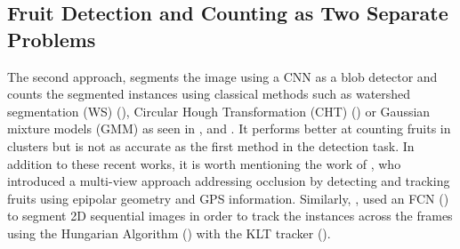 \subsection{Fruit Detection and Counting as Two Separate Problems}
The second approach, segments the image using a CNN as a blob detector and counts the segmented instances using classical methods such as watershed segmentation (WS) (\cite{beucher1992watershed}), Circular Hough Transformation (CHT) (\cite{atherton1999size}) or Gaussian mixture models (GMM) as seen in \cite{hani2018comparative}, \cite{bargoti2017image} and  \cite{chen2017counting}. It performs better at counting fruits in clusters but is not as accurate as the first method in the detection task. In addition to these recent works, it is worth mentioning the work of \cite{stein2016image}, who introduced a multi-view approach addressing occlusion by detecting and tracking fruits using epipolar geometry and GPS information. Similarly, \cite{liu2018robust}, used an FCN (\cite{long2015fully}) to segment 2D sequential images in order to track the instances across the frames using the Hungarian Algorithm (\cite{kuhn1955hungarian}) with the KLT tracker (\cite{lucas1981iterative}).

